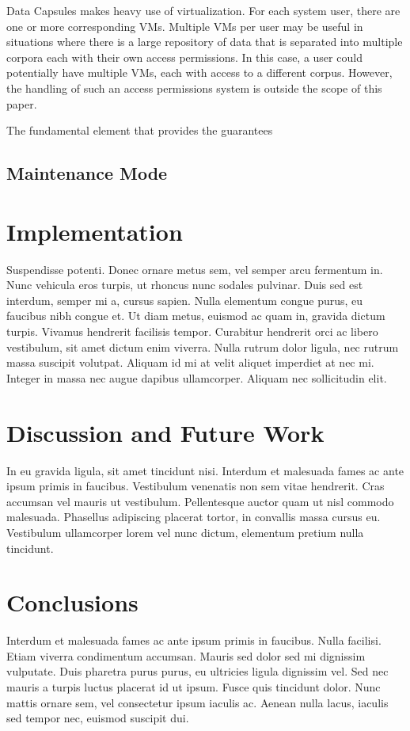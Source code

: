 \documentclass{acm_proc_article-sp}
\begin{document}
Data Capsules makes heavy use of virtualization.  For each system user, there
are one or more corresponding VMs.  Multiple VMs per user may be useful in
situations where there is a large repository of data that is separated into
multiple corpora each with their own access permissions.  In this case, a user
could potentially have multiple VMs, each with access to a different corpus.
However, the handling of such an access permissions system is outside the scope
of this paper.

The fundamental element that provides the guarantees

\subsection{Maintenance Mode}



\section{Implementation}
Suspendisse potenti. Donec ornare metus sem, vel semper arcu fermentum in. Nunc
vehicula eros turpis, ut rhoncus nunc sodales pulvinar. Duis sed est interdum,
semper mi a, cursus sapien. Nulla elementum congue purus, eu faucibus nibh
congue et. Ut diam metus, euismod ac quam in, gravida dictum turpis. Vivamus
hendrerit facilisis tempor. Curabitur hendrerit orci ac libero vestibulum, sit
amet dictum enim viverra. Nulla rutrum dolor ligula, nec rutrum massa suscipit
volutpat. Aliquam id mi at velit aliquet imperdiet at nec mi. Integer in massa
nec augue dapibus ullamcorper. Aliquam nec sollicitudin elit.

\section{Discussion and Future Work}
\label{sec:Discussion}
In eu gravida ligula, sit amet tincidunt nisi. Interdum et malesuada fames ac
ante ipsum primis in faucibus.  Vestibulum venenatis non sem vitae hendrerit.
Cras accumsan vel mauris ut vestibulum. Pellentesque auctor quam ut nisl
commodo malesuada. Phasellus adipiscing placerat tortor, in convallis massa
cursus eu. Vestibulum ullamcorper lorem vel nunc dictum, elementum pretium
nulla tincidunt.

\section{Conclusions}

Interdum et malesuada fames ac ante ipsum primis in faucibus. Nulla facilisi.
Etiam viverra condimentum accumsan. Mauris sed dolor sed mi dignissim
vulputate. Duis \cite{clark:pct} pharetra purus purus, eu ultricies ligula dignissim vel. Sed
nec mauris a turpis luctus placerat id ut ipsum. Fusce quis tincidunt dolor.
Nunc mattis ornare sem, vel consectetur ipsum iaculis ac. Aenean nulla lacus,
iaculis sed tempor nec, euismod suscipit dui.




\end{document}
